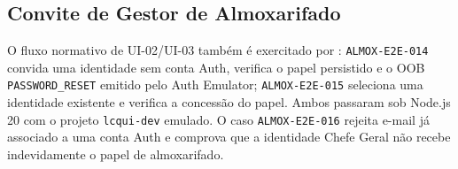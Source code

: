\subsection{Convite de Gestor de Almoxarifado}

O fluxo normativo de UI-02/UI-03 também é exercitado por
: \texttt{ALMOX-E2E-014}
convida uma identidade sem conta Auth, verifica o papel persistido e o OOB
\texttt{PASSWORD\_RESET} emitido pelo Auth Emulator; \texttt{ALMOX-E2E-015}
seleciona uma identidade existente e verifica a concessão do papel. Ambos
passaram sob Node.js 20 com o projeto \texttt{lcqui-dev} emulado. O caso
\texttt{ALMOX-E2E-016} rejeita e-mail já associado a uma conta Auth e comprova
que a identidade Chefe Geral não recebe indevidamente o papel de almoxarifado.
